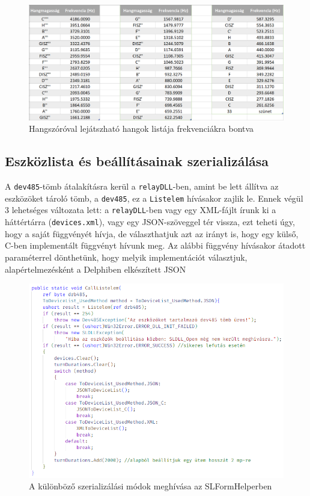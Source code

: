 \documentclass[tocnopagenum]{thesis-ekf}
\begin{document}
	\begin{figure}[h!]
		\centering
		\includegraphics[scale=0.65]{frequencies}
		\caption{Hangszóróval lejátszható hangok listája frekvenciákra bontva}
		\label{fig:frequencies}
	\end{figure}
	
	\subsection{Eszközlista és beállításainak szerializálása}
		A \verb*|dev485|-tömb átalakításra kerül a \verb*|relayDLL|-ben, amint be lett állítva az eszközöket tároló tömb, a \verb*|dev485|, ez a \verb*|Listelem| hívásakor zajlik le. Ennek végül 3 lehetséges változata lett: a \verb*|relayDLL|-ben vagy egy XML-fájlt írunk ki a háttértárra (\verb*|devices.xml|), vagy egy JSON-szöveggel tér vissza, ezt teheti úgy, hogy a saját függvényét hívja, de választhatjuk azt az irányt is, hogy egy külső, C-ben implementált függvényt hívunk meg. 
		Az alábbi függvény hívásakor átadott paraméterrel dönthetünk, hogy melyik implementációt választjuk, alapértelmezésként a Delphiben elkészített JSON
		
		\begin{figure}[h!]
			\centering
			\includegraphics[scale=0.65]{images/listelem_csharp.PNG}
			\caption{A különböző szerializálási módok meghívása az SLFormHelperben}
			\label{fig:listelem_csharp}
		\end{figure}
	
\end{document}
